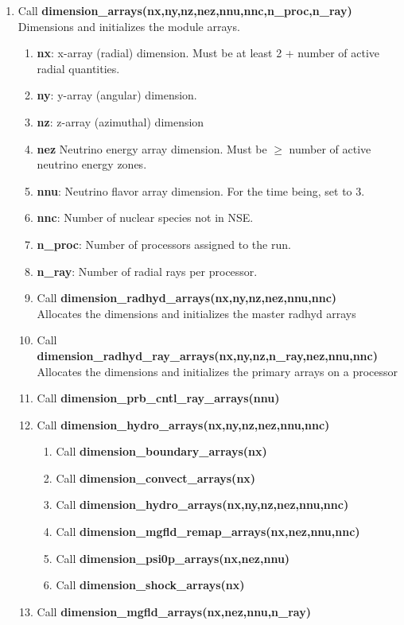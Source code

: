 \documentclass[11pt,doublespace]{article}
\begin{document}
\begin{itemize}
\begin{enumerate}
\begin{enumerate}
  \item Call {\bf dimension\_arrays(nx,ny,nz,nez,nnu,nnc,n\_proc,n\_ray)}\\
  Dimensions and initializes the module arrays.
\begin{enumerate}
  \item {\bf nx}: x-array (radial) dimension. Must be at least 2 + number of active radial quantities.
  \item {\bf ny}: y-array (angular) dimension.
  \item {\bf nz}: z-array (azimuthal) dimension
  \item  {\bf nez} Neutrino energy array dimension. Must be $\ge$ number of active neutrino energy zones.
  \item  {\bf nnu}: Neutrino flavor array dimension. For the time being, set to 3.
  \item  {\bf nnc}: Number of nuclear species not in NSE.
  \item  {\bf n\_proc}: Number of processors assigned to the run.
  \item  {\bf n\_ray}: Number of radial rays per processor.
  \item Call {\bf dimension\_radhyd\_arrays(nx,ny,nz,nez,nnu,nnc)}\\
  Allocates  the dimensions and initializes the master radhyd arrays
  \item Call {\bf dimension\_radhyd\_ray\_arrays(nx,ny,nz,n\_ray,nez,nnu,nnc)}\\
    Allocates  the dimensions and initializes the primary arrays on a processor
  \item Call {\bf dimension\_prb\_cntl\_ray\_arrays(nnu)}
  \item Call {\bf dimension\_hydro\_arrays(nx,ny,nz,nez,nnu,nnc)}
\begin{enumerate}
  \item Call {\bf dimension\_boundary\_arrays(nx)}
  \item Call {\bf dimension\_convect\_arrays(nx)}
  \item Call {\bf dimension\_hydro\_arrays(nx,ny,nz,nez,nnu,nnc)}
  \item Call {\bf dimension\_mgfld\_remap\_arrays(nx,nez,nnu,nnc)}
  \item Call {\bf dimension\_psi0p\_arrays(nx,nez,nnu)}
  \item Call {\bf dimension\_shock\_arrays(nx)}
\end{enumerate}
  \item Call {\bf dimension\_mgfld\_arrays(nx,nez,nnu,n\_ray)}

\end{enumerate}
\end{enumerate}
\end{enumerate}
\end{itemize}
\end{document}
